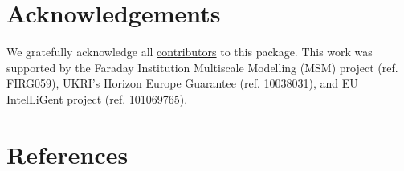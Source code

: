 \documentclass[
]{article}
\begin{document}
\section{Acknowledgements}\label{acknowledgements}

We gratefully acknowledge all
\href{https://github.com/pybop-team/PyBOP?tab=readme-ov-file\#contributors-}{contributors}
to this package. This work was supported by the Faraday Institution
Multiscale Modelling (MSM) project (ref. FIRG059), UKRI's Horizon Europe
Guarantee (ref. 10038031), and EU IntelLiGent project (ref. 101069765).

\section*{References}\label{references}
\end{document}
